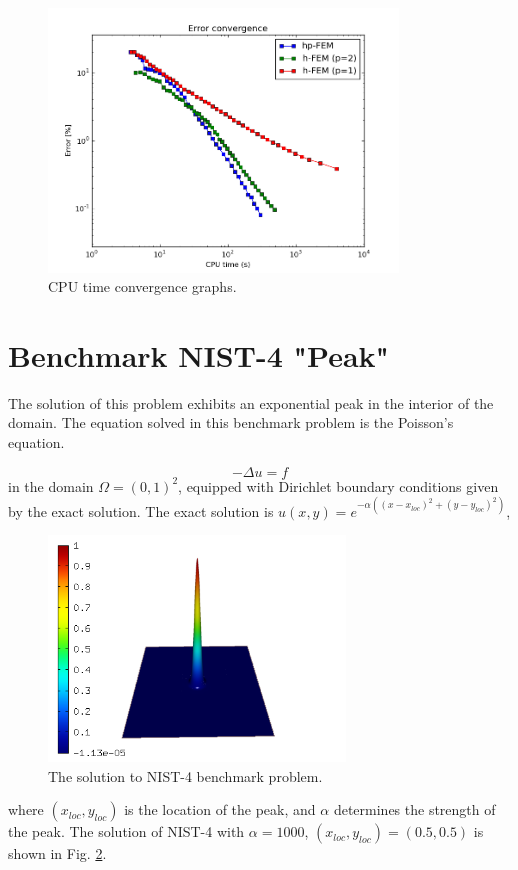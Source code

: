 \documentclass[12pt]{elsarticle}
\begin{document}
\begin{figure}[H]
\centering
\includegraphics[height=7cm]{nist/nist-3/conv_cpu_aniso.png}
\caption{CPU time convergence graphs.}
\label{fig:nist-3-conv-cpu}
\end{figure}


\section{Benchmark NIST-4 "Peak"}
\label{sec:bench-4}

The solution of this problem exhibits an exponential peak in the interior of the domain.
The equation solved in this benchmark problem is the Poisson's equation.

\begin{equation} \label{poisson-peak}
-\Delta u = f
\end{equation}
in the domain $\Omega = (0, 1)^2$, equipped with Dirichlet
boundary conditions given by the exact solution.
The exact solution is
$u(x,y) = e^{-\alpha ((x - x_{loc})^{2} + (y - y_{loc})^{2})}$,

\begin{figure}[H]
\centering
\vspace{-3mm}
\includegraphics[height=6cm]{nist/nist-4/solution.png}
\vspace{-3mm}
\caption{The solution to NIST-4 benchmark problem.}
\vspace{-3mm}
\label{fig:sln-nist04}
\end{figure}
\noindent
where $(x_{loc}, y_{loc})$ is the location of the peak,
and $\alpha$ determines the strength of the peak.
The solution of NIST-4 with $\alpha = 1000$,
$(x_{loc}, y_{loc}) = (0.5, 0.5)$ is shown in Fig. \ref{fig:sln-nist04}.
\end{document}
